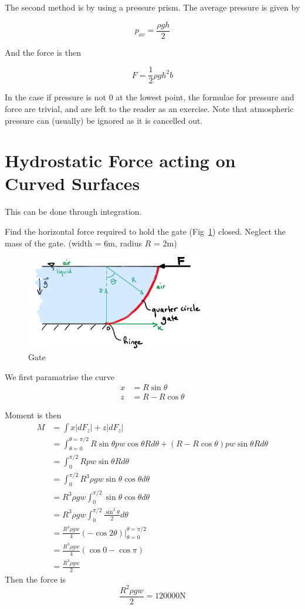 \documentclass[12pt]{article}
\begin{document}
The second method is by using a pressure prism. The average pressure is given by

$$p_{av} = \frac{\rho gh}{2}$$

And the force is then

$$F = \frac{1}{2}\rho gh^2b$$

In the case if pressure is not 0 at the lowest point, the formulae for pressure and force are trivial, and are left to the reader as an exercise. Note that atmospheric pressure can (usually) be ignored as it is cancelled out.

\section{Hydrostatic Force acting on Curved Surfaces}

This can be done through integration.
\begin{ex}
	Find the horizontal force required to hold the gate (Fig~\ref{gate2}) closed. Neglect the mass of the gate. (width = 6m, radius $R$ = 2m)

	\begin{figure}
		\centering
		\includegraphics[width=0.7\textwidth]{gate2.png}
		\caption{Gate}
		\label{gate2}
	\end{figure}

	We first paramatrise the curve
	\begin{align*}
		x &= R\sin\theta \\
		z &= R - R\cos\theta
	\end{align*}

	Moment is then
	\begin{align*}
		M &= \int x |dF_z| + z |dF_z| \\
		  &= \int_{\theta = 0}^{\theta = \pi/2} R \sin{\theta} p w \cos{\theta} R d\theta + (R - R\cos{\theta})pw\sin{\theta}R d\theta \\
		  &= \int_0^{\pi/2} Rpw\sin{\theta} R d\theta \\
		  &= \int_0^{\pi/2} R^3 \rho g w \sin{\theta} \cos{\theta} d\theta \\
		  &= R^3 \rho g w \int_0^{\pi/2} \sin{\theta} \cos{\theta} d\theta \\
		  &= R^3 \rho g w \int_0^{\pi/2} \frac{\sin^2{\theta}}{2} d\theta \\
		  &= \frac{R^3 \rho g w}{4} (-\cos{2\theta}) \Big |_{\theta=0}^{\theta=\pi/2} \\
		  &= \frac{R^3 \rho g w}{4} (\cos{0} - \cos{\pi}) \\
		  &= \frac{R^3 \rho g w}{2}
	\end{align*}
	Then the force is
	$$\frac{R^2\rho gw}{2} = 120000\text{N}$$
\end{ex}
\end{document}
